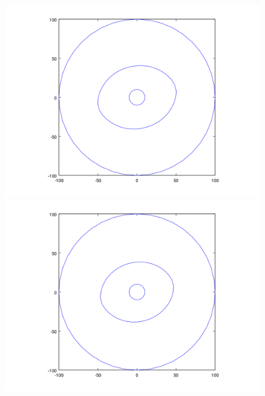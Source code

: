 \begin{figure}[H]
\centering
\begin{minipage}{0.30\textwidth}
  \centering
    \includegraphics[width=1\textwidth]{imgs/comp_rads_bueno/comp_radss_iso5.png}
  \caption{}
  \label{fig:Radios1}
\end{minipage}%
\hspace{0.03\textwidth}
\begin{minipage}{0.30\textwidth}   
  \centering
    \includegraphics[width=1\textwidth]{imgs/comp_rads_bueno/comp_radss_iso2.png} 
    \caption{} 
  \label{fig:Radios2}
\end{minipage}%
\hspace{0.03\textwidth}
\begin{minipage}{0.30\textwidth}   

\end{minipage}
\end{figure}
